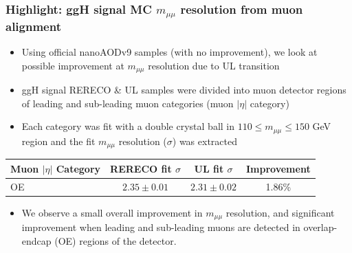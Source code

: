 \documentclass[dvipsnames,aspectratio=169]{beamer}
\begin{document}
\begin{frame}
    \frametitle{Highlight: ggH signal MC $m_{\mu\mu}$ resolution from muon alignment}
    \begin{itemize}
    \item Using official nanoAODv9 samples (with no improvement), we look at possible improvement at $m_{\mu\mu}$ resolution due to UL transition
    \item ggH signal RERECO \& UL samples were divided into muon detector regions of leading and sub-leading muon categories (muon $|\eta|$ category)
    \item Each category was fit with a double crystal ball in $110\leq m_{\mu\mu} \leq 150$ GeV region and the fit $m_{\mu\mu}$ resolution ($\sigma$) was extracted
    \end{itemize}
    \begin{table}[h]
    \centering
    \begin{tabular}{lccc}
        \hline
        Muon $|\eta|$ Category & RERECO fit $\sigma$ & UL fit $\sigma$ & Improvement \\
        \hline
        OE & $2.35 \pm 0.01$ & $2.31 \pm 0.02$ & 1.86\% \\
        \hline
    \end{tabular}
\end{table}
\begin{itemize}
\item We observe a small overall improvement in $m_{\mu\mu}$ resolution, and significant improvement when leading and sub-leading muons are detected in overlap-endcap (OE) regions of the detector.
\end{itemize}
\end{frame}

    
\end{document}
